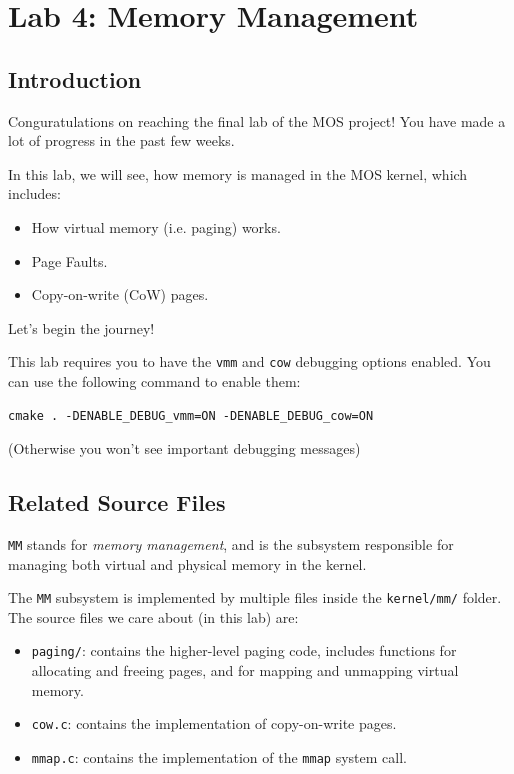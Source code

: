 \chapter{Lab 4: Memory Management}

\section{Introduction}

Conguratulations on reaching the final lab of the MOS project! You have
made a lot of progress in the past few weeks.

In this lab, we will see, how memory is managed in the MOS kernel, which includes:

\begin{itemize}
    \item How virtual memory (i.e. paging) works.
    \item Page Faults.
    \item Copy-on-write (CoW) pages.
\end{itemize}

Let's begin the journey!

\begin{note}
    \item This lab requires you to have the \texttt{vmm} and \texttt{cow} debugging options
    enabled. You can use the following command to enable them:
    \begin{verbatim}
cmake . -DENABLE_DEBUG_vmm=ON -DENABLE_DEBUG_cow=ON
    \end{verbatim}
    \item (Otherwise you won't see important debugging messages)
\end{note}

\section{Related Source Files}

\texttt{MM} stands for \textit{memory management}, and is the subsystem
responsible for managing both virtual and physical memory in the kernel.

The \texttt{MM} subsystem is implemented by multiple files inside the \texttt{kernel/mm/}
folder. The source files we care about (in this lab) are:

\begin{itemize}
    \item \texttt{paging/}: contains the higher-level paging code, includes functions
          for allocating and freeing pages, and for mapping and unmapping virtual
          memory.
    \item \texttt{cow.c}: contains the implementation of copy-on-write pages.
    \item \texttt{mmap.c}: contains the implementation of the \texttt{mmap} system call.
\end{itemize}

